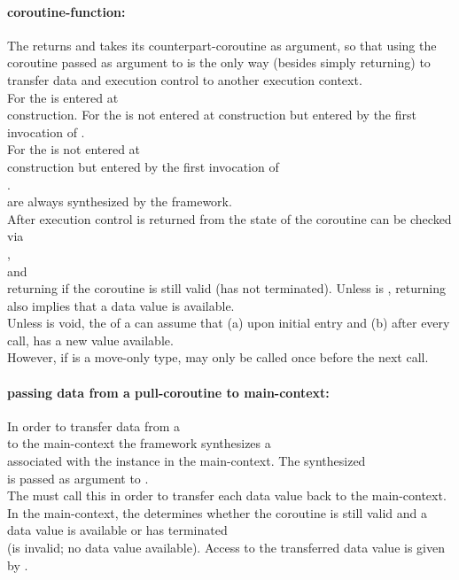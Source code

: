 \paragraph*{coroutine-function:}
The \corofunction returns  and takes its counterpart-coroutine as
argument, so that using the coroutine passed as argument to \corofunction is the
only way (besides simply returning) to transfer data and execution control to
another execution context.\\
\newline
For \pullcoro the \corofunction is entered at\\
\pullcoro construction.
For \pushcoro the \corofunction is not entered at \pushcoro construction but
entered by the first invocation of \pushcoroop.\\
\newline
For \callcoro the \corofunction is not entered at\\
\callcoro construction but entered by the first invocation of\\
\callcoroop.\\
\yieldcoro are always synthesized by the framework.\\
After execution control is returned from \corofunction the state of the
coroutine can be checked via\\
\pullcorobool,\\
\pushcorobool and\\
\callcorobool returning  if the coroutine is still valid (\corofunction has
not terminated).
\newline
Unless  is , \pullcorobool returning  also implies
that a data value is available.\\
\newline
Unless  is void, the \corofunction of a \callcoro
can assume that (a) upon initial entry and (b) after every\\
\yieldcoroop call, \yieldcoroget has a new value available.\\
However, if  is a move-only type, \yieldcoroget may
only be called once before the next \yieldcoroop call.

\paragraph*{passing data from a pull-coroutine to main-context:}
In order to transfer data from a\\
\pullcoro to the main-context the framework synthesizes a\\
\pushcoro associated
with the \pullcoro instance in the main-context. The synthesized\\
\pushcoro is passed as argument to \corofunction.\\
The \corofunction must call this \pushcoroop in order to transfer each
data value back to the main-context.\\
In the main-context, the \pullcorobool determines whether the coroutine is still
valid and a data value is available or \corofunction has terminated\\
(\pullcoro is invalid; no data value available). Access to the transferred data
value is given by \pullcoroget.

